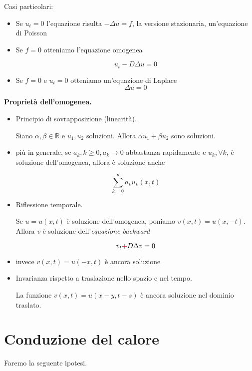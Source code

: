 \documentclass[10pt,a4paper,twoside,openright]{book}
\begin{document}
Casi particolari:
\begin{itemize}
\item Se $u_{t} =0$ l'equazione risulta $-\Delta u=f$, la versione stazionaria, un'equazione di Poisson
\item Se $f=0$ otteniamo l'equazione omogenea

\begin{equation*}
u_{t} -D\Delta u=0
\end{equation*}
\item Se $f=0$ e $u_{t} =0$ otteniamo un'equazione di Laplace\begin{equation*}
\Delta u=0
\end{equation*}
\end{itemize}

\textbf{Proprietà dell'omogenea.}
\begin{itemize}
\item Principio di sovrapposizione (linearità).

Siano $\alpha,\beta \in \mathbb{R}$ e $u_{1},u_{2}$ soluzioni. Allora $\alpha u_{1} +\beta u_{2}$ sono soluzioni.
\item più in generale, se $a_{k},k\geqslant 0,a_{k}\rightarrow 0$ abbastanza rapidamente e $u_{k},\forall k$, è soluzione dell'omogenea, allora è soluzione anche

\begin{equation*}
\sum\limits ^{\infty }_{k=0} a_{k} u_{k}(x,t)
\end{equation*}
\item Riflessione temporale.

Se $u=u(x,t)$ è soluzione dell'omogenea, poniamo $v(x,t) =u(x,-t)$. Allora $v$ è soluzione dell'\textit{equazione backward}

\begin{equation*}
v_{t}\textcolor[rgb]{0.82,0.01,0.11}{+} D\Delta v=0
\end{equation*}
\item invece $v(x,t) =u(-x,t)$ è ancora soluzione
\item Invarianza rispetto a traslazione nello spazio e nel tempo.

La funzione $v(x,t) =u(x-y,t-s)$ è ancora soluzione nel dominio traslato.
\end{itemize}
\section{Conduzione del calore}

Faremo la seguente ipotesi.
\end{document}
